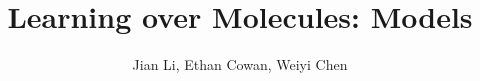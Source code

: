 \documentclass{harvard-thesis}
\begin{document}

\title{Learning over Molecules: Models}
\author{Jian Li, Ethan Cowan, Weiyi Chen}
\maketitle
\abstractpage
\tableofcontents

\onehalfspacing








\singlespacing

\clearpage



\end{document}
